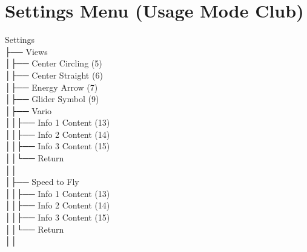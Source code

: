 \section{Settings Menu (Usage Mode Club)}
\menufont
Settings \\
├── Views \\
│\hspace{2em}├── Center Circling (5) \\
│\hspace{2em}├── Center Straight (6) \\
│\hspace{2em}├── Energy Arrow (7) \\
│\hspace{2em}├── Glider Symbol (9) \\
│\hspace{2em}├── Vario \\
│\hspace{2em}│\hspace{2em}├── Info 1 Content (13) \\
│\hspace{2em}│\hspace{2em}├── Info 2 Content (14) \\
│\hspace{2em}│\hspace{2em}├── Info 3 Content (15) \\
│\hspace{2em}│\hspace{2em}└── Return \\
│\hspace{2em}│\hspace{2em} \\
│\hspace{2em}├── Speed to Fly \\
│\hspace{2em}│\hspace{2em}├── Info 1 Content (13) \\
│\hspace{2em}│\hspace{2em}├── Info 2 Content (14) \\
│\hspace{2em}│\hspace{2em}├── Info 3 Content (15) \\
│\hspace{2em}│\hspace{2em}└── Return \\
│\hspace{2em}│\hspace{2em} \\
